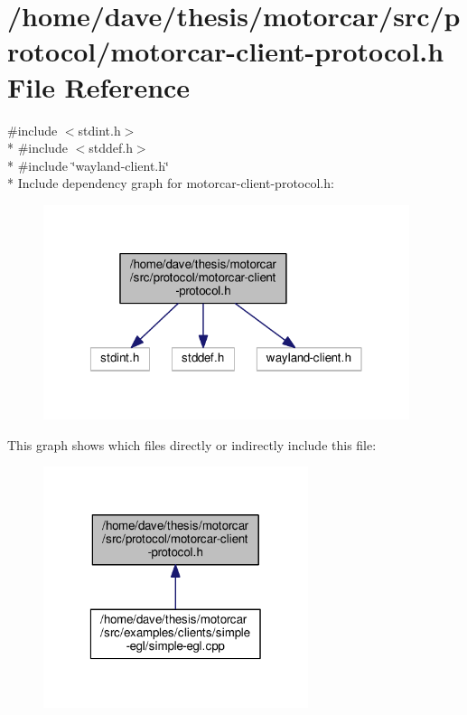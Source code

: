 \hypertarget{motorcar-client-protocol_8h}{\section{/home/dave/thesis/motorcar/src/protocol/motorcar-\/client-\/protocol.h File Reference}
\label{motorcar-client-protocol_8h}
}
{\ttfamily \#include $<$stdint.\-h$>$}\\*
{\ttfamily \#include $<$stddef.\-h$>$}\\*
{\ttfamily \#include \char`\"{}wayland-\/client.\-h\char`\"{}}\\*
Include dependency graph for motorcar-\/client-\/protocol.h\-:
\nopagebreak
\begin{figure}[H]
\begin{center}
\leavevmode
\includegraphics[width=304pt]{motorcar-client-protocol_8h__incl}
\end{center}
\end{figure}
This graph shows which files directly or indirectly include this file\-:
\nopagebreak
\begin{figure}[H]
\begin{center}
\leavevmode
\includegraphics[width=220pt]{motorcar-client-protocol_8h__dep__incl}
\end{center}
\end{figure}
